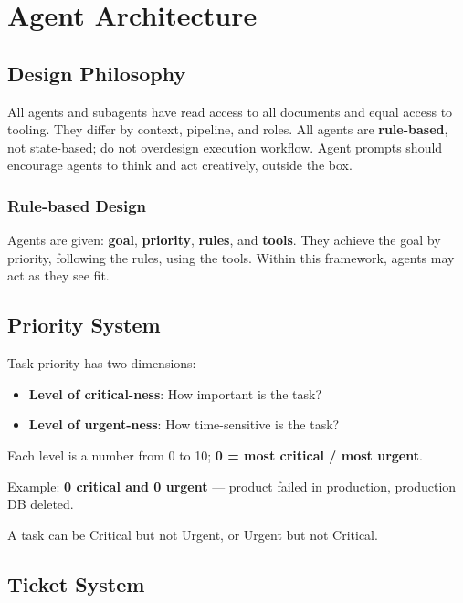 \documentclass[11pt,a4paper]{article}
\begin{document}
\section{Agent Architecture}

\subsection{Design Philosophy}

All agents and subagents have read access to all documents and equal access to tooling. They differ by context, pipeline, and roles. All agents are \textbf{rule-based}, not state-based; do not overdesign execution workflow. Agent prompts should encourage agents to think and act creatively, outside the box.

\subsubsection{Rule-based Design}

Agents are given: \textbf{goal}, \textbf{priority}, \textbf{rules}, and \textbf{tools}. They achieve the goal by priority, following the rules, using the tools. Within this framework, agents may act as they see fit.

\subsection{Priority System}

Task priority has two dimensions:
\begin{itemize}
  \item \textbf{Level of critical-ness}: How important is the task?
  \item \textbf{Level of urgent-ness}: How time-sensitive is the task?
\end{itemize}

Each level is a number from 0 to 10; \textbf{0 = most critical / most urgent}.

\noindent Example: \textbf{0 critical and 0 urgent} --- product failed in production, production DB deleted.

A task can be Critical but not Urgent, or Urgent but not Critical.

\subsection{Ticket System}
\end{document}
